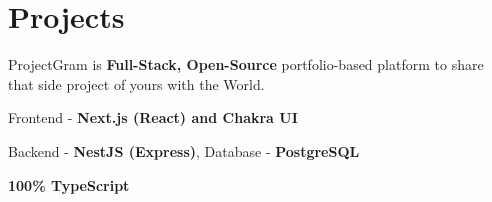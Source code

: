\documentclass[]{deedy-resume-openfont}
\begin{document}
\begin{minipage}[t]{0.67\textwidth}



\section{Projects}

ProjectGram is \textbf{Full-Stack, Open-Source} portfolio-based platform to share that side project of yours with the World.
\\
\begin{tightemize}
\item Frontend - \textbf{Next.js (React) and Chakra UI }
\item Backend - \textbf {NestJS (Express)}, Database - \textbf {PostgreSQL}
\item \textbf {100\% TypeScript}
\end{tightemize}
\sectionsep




\end{minipage}
\end{document}
